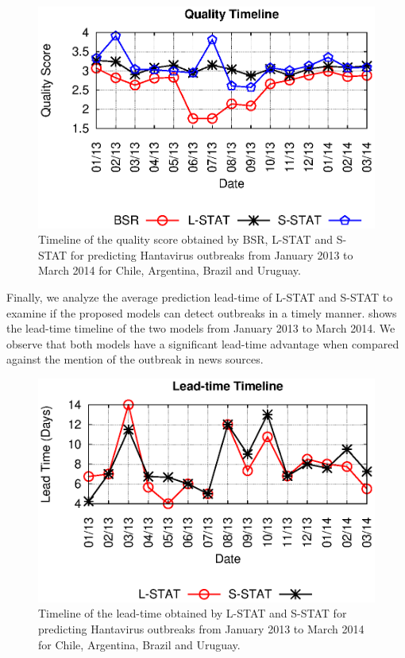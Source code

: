 \documentclass[conference]{IEEEtran}
\newcommand{\fullmodel}{{S-STAT}\xspace}
\newcommand{\locationmodel}{{L-STAT}\xspace}
\begin{document}
\begin{figure}[h]
\begin{center}
	\includegraphics[trim=0 0 0 0, clip,scale=0.5]{fig/quality_timeline.eps}
\end{center}
\caption{Timeline of the quality score obtained by BSR, \locationmodel and \fullmodel for predicting Hantavirus outbreaks from January 2013 to March 2014 for Chile, Argentina, Brazil and Uruguay.}
 \label{fig:quality_timeline}
\end{figure}

Finally, we analyze the average prediction lead-time of \locationmodel and \fullmodel to examine if the proposed models can detect outbreaks in a timely manner.  
 shows the lead-time timeline of the two models from January 2013 to March 2014. We observe that both models have a significant lead-time advantage when compared against  the mention of the outbreak in news sources.

\begin{figure}[h]
\begin{center}
	\includegraphics[trim=0 0 0 0, clip,scale=0.5]{fig/lead_timeline.eps}
\end{center}
\caption{Timeline of the lead-time obtained by \locationmodel and \fullmodel for predicting Hantavirus outbreaks from January 2013 to March 2014 for Chile, Argentina, Brazil and Uruguay.}
 \label{fig:lead_timeline}
\end{figure}
\end{document}
